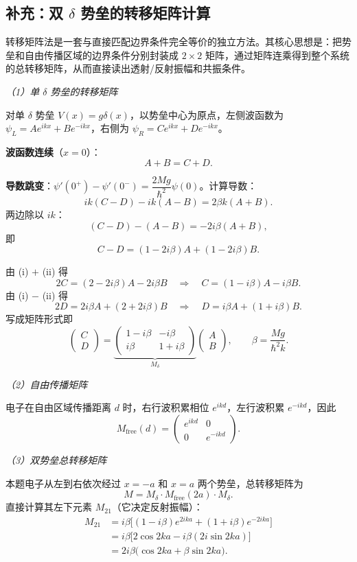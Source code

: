 \subsection{补充：双 $\delta$ 势垒的转移矩阵计算}

转移矩阵法是一套与直接匹配边界条件完全等价的独立方法。其核心思想是：把势垒和自由传播区域的边界条件分别封装成 $2\times 2$ 矩阵，通过矩阵连乘得到整个系统的总转移矩阵，从而直接读出透射/反射振幅和共振条件。

\textit{（1）单 $\delta$ 势垒的转移矩阵}

对单 $\delta$ 势垒 $V(x)=g\delta(x)$，以势垒中心为原点，左侧波函数为 $\psi_L = Ae^{ikx} + Be^{-ikx}$，右侧为 $\psi_R = Ce^{ikx} + De^{-ikx}$。

\textbf{波函数连续}（$x=0$）：
\[
A + B = C + D. \tag{i}
\]

\textbf{导数跳变}：$\psi'(0^+) - \psi'(0^-) = \dfrac{2Mg}{\hbar^2}\psi(0)$。计算导数：
\[
ik(C-D) - ik(A-B) = 2\beta k (A+B).
\]
两边除以 $ik$：
\[
(C-D) - (A-B) = -2i\beta (A+B),
\]
即
\[
C - D = (1-2i\beta)A + (1-2i\beta)B. \tag{ii}
\]

由 (i) $+$ (ii) 得
\[
2C = (2-2i\beta)A - 2i\beta B \quad\Longrightarrow\quad C = (1-i\beta)A - i\beta B.
\]
由 (i) $-$ (ii) 得
\[
2D = 2i\beta A + (2+2i\beta)B \quad\Longrightarrow\quad D = i\beta A + (1+i\beta)B.
\]
写成矩阵形式即
\[
\begin{pmatrix} C \\ D \end{pmatrix}
=
\underbrace{\begin{pmatrix} 1-i\beta & -i\beta \\ i\beta & 1+i\beta \end{pmatrix}}_{M_\delta}
\begin{pmatrix} A \\ B \end{pmatrix},
\qquad \beta = \frac{Mg}{\hbar^2 k}.
\]

\textit{（2）自由传播矩阵}

电子在自由区域传播距离 $d$ 时，右行波积累相位 $e^{ikd}$，左行波积累 $e^{-ikd}$，因此
\[
M_{\text{free}}(d) = \begin{pmatrix} e^{ikd} & 0 \\ 0 & e^{-ikd} \end{pmatrix}.
\]

\textit{（3）双势垒总转移矩阵}

本题电子从左到右依次经过 $x=-a$ 和 $x=a$ 两个势垒，总转移矩阵为
\[
M = M_\delta \cdot M_{\text{free}}(2a) \cdot M_\delta.
\]
直接计算其左下元素 $M_{21}$（它决定反射振幅）：
\begin{align*}
M_{21} &= i\beta\bigl[(1-i\beta)e^{2ika} + (1+i\beta)e^{-2ika}\bigr] \\
&= i\beta\bigl[2\cos 2ka - i\beta(2i\sin 2ka)\bigr] \\
&= 2i\beta\bigl(\cos 2ka + \beta\sin 2ka\bigr).
\end{align*}

